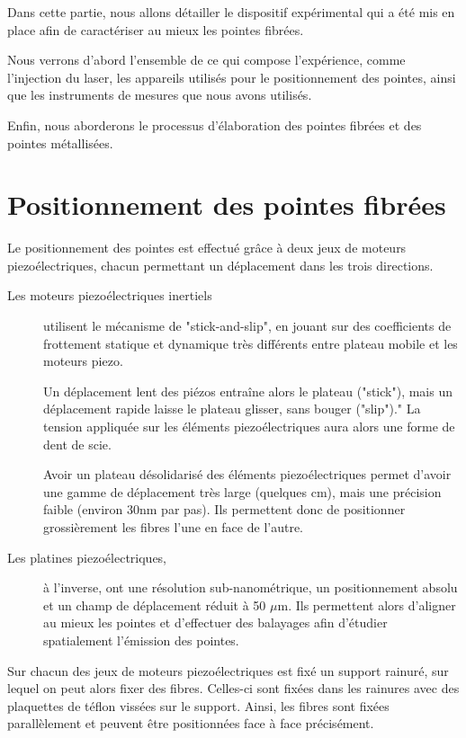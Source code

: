 Dans cette partie, nous allons détailler le dispositif expérimental qui a été mis en place afin de caractériser au mieux les pointes fibrées.

Nous verrons d'abord l'ensemble de ce qui compose l'expérience, comme l'injection du laser, les appareils utilisés pour le positionnement des pointes, ainsi que les instruments de mesures que nous avons utilisés.

Enfin, nous aborderons le processus d'élaboration des pointes fibrées et des pointes métallisées.

\section{Positionnement des pointes fibrées}
Le positionnement des pointes est effectué grâce à deux jeux de moteurs piezoélectriques, chacun permettant un déplacement dans les trois directions.
\begin{description}
    \item[Les moteurs piezoélectriques inertiels\footnotemark] utilisent le mécanisme de "stick-and-slip", en jouant sur des coefficients de frottement statique et dynamique très différents entre plateau mobile et les moteurs piezo.

    Un déplacement lent des piézos entraîne alors le plateau ("stick"), mais un déplacement rapide laisse le plateau glisser, sans bouger ("slip")." La tension appliquée sur les éléments piezoélectriques aura alors une forme de dent de scie.

    Avoir un plateau désolidarisé des éléments piezoélectriques permet d'avoir une gamme de déplacement très large (quelques cm), mais une précision faible (environ 30nm par pas). Ils permettent donc de positionner grossièrement les fibres l'une en face de l'autre.

    \item[Les platines piezoélectriques\footnotemark,] à l'inverse, ont une résolution sub-nanométrique, un positionnement absolu et un champ de déplacement réduit à 50 $\mu$m. Ils permettent alors d'aligner au mieux les pointes et d'effectuer des balayages afin d'étudier spatialement l'émission des pointes.
\end{description}

Sur chacun des jeux de moteurs piezoélectriques est fixé un support rainuré, sur lequel on peut alors fixer des fibres. Celles-ci sont fixées dans les rainures avec des plaquettes de téflon vissées sur le support. Ainsi, les fibres sont fixées parallèlement et peuvent être positionnées face à face précisément.


